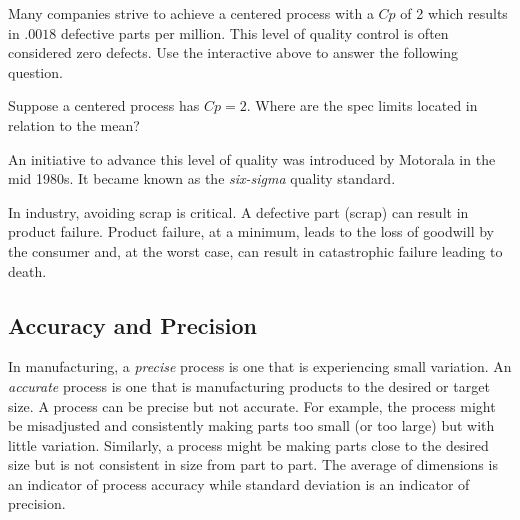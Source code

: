 \documentclass{ximera}
\begin{document}
\begin{onlineOnly}
\begin{center} 
\end{center}
\end{onlineOnly}

Many companies strive to achieve a centered process with a $Cp$ of 2 which results in $.0018$ defective parts per million.  This level of quality control is often considered zero defects. Use the interactive above to answer the following question.

\begin{question}\label{qest:sixSigma}
    Suppose a centered process has $Cp=2$.  Where are the spec limits located in relation to the mean?
    \begin{multipleChoice}
    \end{multipleChoice}

An initiative to advance this level of quality was introduced by Motorala in the mid 1980s.  It became known as the \emph{six-sigma} quality standard.
  \end{question}
 

In industry, avoiding scrap is critical. A defective part (scrap) can result in product failure. Product failure, at a minimum, leads to the loss of goodwill by the consumer and, at the worst case, can result in catastrophic failure leading to death.

\subsection*{Accuracy and Precision}

In manufacturing, a \emph{precise} process is one that is experiencing small variation. An \emph{accurate} process is one that is manufacturing products to the desired or target size. A process can be precise but not accurate. For example, the process might be misadjusted and consistently making parts too small (or too large) but with little variation.  Similarly, a process might be making parts close to the desired size but is not consistent in size from part to part.  The average of dimensions is an indicator of process accuracy while standard deviation is an indicator of precision. 
\end{document}
